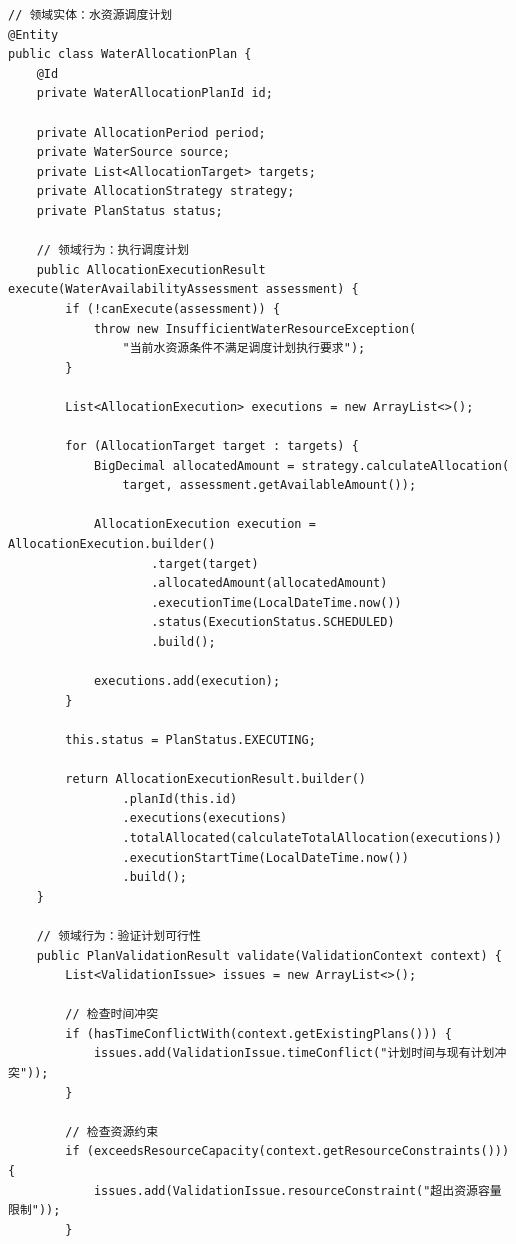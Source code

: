 \begin{lstlisting}[style=java]
// 领域实体：水资源调度计划
@Entity
public class WaterAllocationPlan {
    @Id
    private WaterAllocationPlanId id;
    
    private AllocationPeriod period;
    private WaterSource source;
    private List<AllocationTarget> targets;
    private AllocationStrategy strategy;
    private PlanStatus status;
    
    // 领域行为：执行调度计划
    public AllocationExecutionResult execute(WaterAvailabilityAssessment assessment) {
        if (!canExecute(assessment)) {
            throw new InsufficientWaterResourceException(
                "当前水资源条件不满足调度计划执行要求");
        }
        
        List<AllocationExecution> executions = new ArrayList<>();
        
        for (AllocationTarget target : targets) {
            BigDecimal allocatedAmount = strategy.calculateAllocation(
                target, assessment.getAvailableAmount());
                
            AllocationExecution execution = AllocationExecution.builder()
                    .target(target)
                    .allocatedAmount(allocatedAmount)
                    .executionTime(LocalDateTime.now())
                    .status(ExecutionStatus.SCHEDULED)
                    .build();
                    
            executions.add(execution);
        }
        
        this.status = PlanStatus.EXECUTING;
        
        return AllocationExecutionResult.builder()
                .planId(this.id)
                .executions(executions)
                .totalAllocated(calculateTotalAllocation(executions))
                .executionStartTime(LocalDateTime.now())
                .build();
    }
    
    // 领域行为：验证计划可行性
    public PlanValidationResult validate(ValidationContext context) {
        List<ValidationIssue> issues = new ArrayList<>();
        
        // 检查时间冲突
        if (hasTimeConflictWith(context.getExistingPlans())) {
            issues.add(ValidationIssue.timeConflict("计划时间与现有计划冲突"));
        }
        
        // 检查资源约束
        if (exceedsResourceCapacity(context.getResourceConstraints())) {
            issues.add(ValidationIssue.resourceConstraint("超出资源容量限制"));
        }
        

\end{lstlisting}
